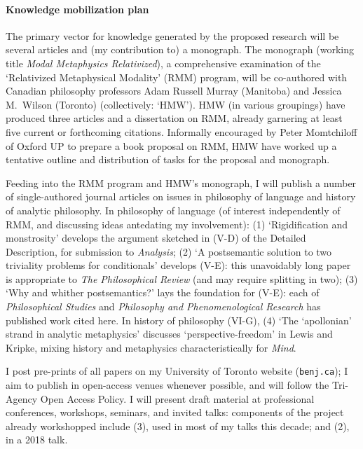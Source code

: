 \documentclass[12pt]{article}
\begin{document}
\paragraph{Knowledge mobilization plan}


The primary vector for knowledge generated by the proposed research will be several articles and (my contribution to) a monograph. The monograph (working title \emph{Modal Metaphysics Relativized}), a comprehensive examination of the `Relativized Metaphysical Modality' (RMM) program, will be co-authored with Canadian philosophy professors Adam Russell Murray (Manitoba) and Jessica M.~Wilson (Toronto) (collectively: `HMW'). HMW (in various groupings) have produced three articles and a dissertation on RMM, already garnering at least five current or forthcoming citations. Informally encouraged by Peter Momtchiloff of Oxford UP to prepare a book proposal on RMM, HMW have worked up a tentative outline and distribution of tasks for the proposal and monograph.

Feeding into the RMM program and HMW's monograph, I will publish a number of single-authored journal articles on issues in philosophy of language and history of analytic philosophy. In philosophy of language (of interest independently of RMM, and discussing ideas antedating my involvement): (1) `Rigidification and monstrosity' develops the argument sketched in (V-D) of the Detailed Description, for submission to \emph{Analysis}; (2) `A postsemantic solution to two triviality problems for conditionals' develops (V-E): this unavoidably long paper is appropriate to \emph{The Philosophical Review} (and may require splitting in two); (3) `Why and whither postsemantics?' lays the foundation for (V-E): each of \emph{Philosophical Studies} and \emph{Philosophy and Phenomenological Research} has published work cited here. In history of philosophy (VI-G), (4) `The `apollonian' strand in analytic metaphysics' discusses `perspective-freedom' in Lewis and Kripke, mixing history and metaphysics characteristically for \emph{Mind}.

I post pre-prints of all papers on my University of Toronto website (\texttt{benj.ca}); I aim to publish in open-access venues whenever possible, and will follow the Tri-Agency Open Access Policy. I will present draft material at professional conferences, workshops, seminars, and invited talks: components of the project already workshopped include (3), used in most of my talks this decade; and (2), in a 2018 talk.
\end{document}
